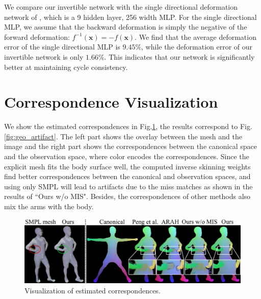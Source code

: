 We compare our invertible network with the single directional deformation network of \citet{peng2022animatable}, which is a 9 hidden layer, 256 width MLP.
For the single directional MLP, we assume that the backward deformation is simply the negative of the forward deformation: $f^{-1}(\mathbf{x}) = -f(\mathbf{x})$.
We find that the average deformation error of the single directional MLP is $9.45\%$, while the deformation error of our invertible network is only $1.66\%$.
This indicates that our network is significantly better at maintaining cycle consistency. 

\section{Correspondence Visualization}
We show the estimated correspondences in Fig.\ref{fig:corres}, the results correspond to Fig.\ref{fig:geo_artifact}.
The left part shows the overlay between the mesh and the image and the right part shows the correspondences between the canonical space and the observation space, where color encodes the correspondences. 
Since the explicit mesh fits the body surface well, the computed inverse skinning weights find better correspondences between the canonical and observation spaces, and using only SMPL will lead to artifacts due to the miss matches as shown in the results of ``Ours w/o MIS".
Besides, the correspondences of other methods also mix the arms with the body. 

\begin{figure}[t]
\begin{center}
   \includegraphics[width=0.65\linewidth]{./fig/corres_zoom_in.jpg}
\end{center}
\caption{Visualization of estimated correspondences.}
\label{fig:corres}
\end{figure}

